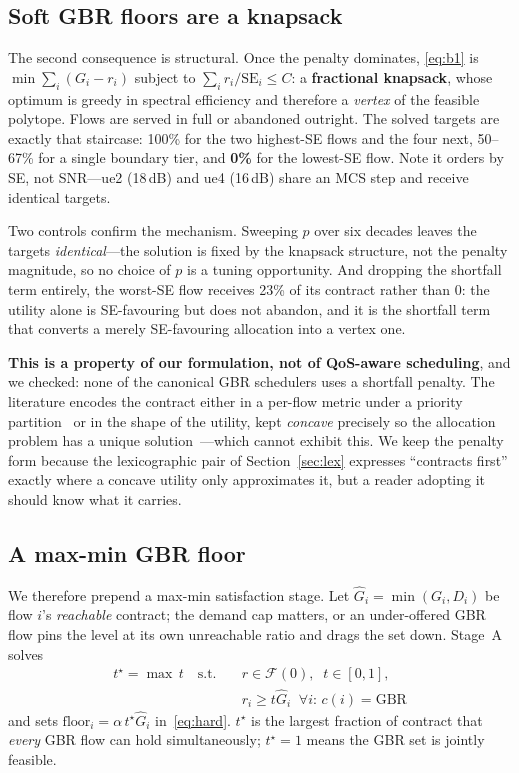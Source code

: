 \documentclass[conference]{IEEEtran}
\begin{document}
\subsection{Soft GBR floors are a knapsack}\label{sec:knapsack}

The second consequence is structural. Once the penalty dominates,
\eqref{eq:b1} is $\min \sum_i (G_i - r_i)$ subject to
$\sum_i r_i/\mathrm{SE}_i \le C$: a \textbf{fractional knapsack}, whose
optimum is greedy in spectral efficiency and therefore a \emph{vertex} of
the feasible polytope. Flows are served in full or abandoned outright.
The solved targets are exactly that staircase: 100\% for the two highest-SE
flows and the four next, 50--67\% for a single boundary tier, and
\textbf{0\%} for the lowest-SE flow. Note it orders by SE, not SNR---ue2
(18\,dB) and ue4 (16\,dB) share an MCS step and receive identical targets.

Two controls confirm the mechanism. Sweeping $p$ over six decades leaves the
targets \emph{identical}---the solution is fixed by the knapsack structure,
not the penalty magnitude, so no choice of $p$ is a tuning opportunity. And
dropping the shortfall term entirely, the worst-SE flow receives 23\% of its
contract rather than $0$: the utility alone is SE-favouring but does not
abandon, and it is the shortfall term that converts a merely SE-favouring
allocation into a vertex one.

\textbf{This is a property of our formulation, not of QoS-aware
scheduling}, and we checked: none of the canonical GBR schedulers uses a
shortfall penalty. The literature encodes the contract either in a per-flow
metric under a priority
partition~\cite{monghal2008qos,zaki2011multi,ameigeiras2016qos} or in the
shape of the utility, kept \emph{concave} precisely so the allocation
problem has a unique solution~\cite{gora2014qos}---which cannot exhibit
this. We keep the penalty form because the lexicographic pair of
Section~\ref{sec:lex} expresses ``contracts first'' exactly where a concave
utility only approximates it, but a reader adopting it should know what it
carries.

\subsection{A max-min GBR floor}\label{sec:maxmin}

We therefore prepend a max-min satisfaction stage. Let
$\hat{G}_i = \min(G_i, D_i)$ be flow $i$'s \emph{reachable} contract; the
demand cap matters, or an under-offered GBR flow pins the level at its own
unreachable ratio and drags the set down. Stage~A solves
\begin{equation}
\begin{aligned}
t^\star = \max\, t \quad \text{s.t.} \quad & r\in\mathcal{F}(0), \;\; t\in[0,1],\\
& r_i \ge t\hat{G}_i \;\; \forall i{:}\, c(i){=}\mathrm{GBR}
\end{aligned}
\label{eq:maxmin}
\end{equation}
and sets $\mathrm{floor}_i = \alpha\, t^\star \hat{G}_i$ in~\eqref{eq:hard}.
$t^\star$ is the largest fraction of contract that \emph{every} GBR flow
can hold simultaneously; $t^\star = 1$ means the GBR set is jointly
feasible.
\end{document}
